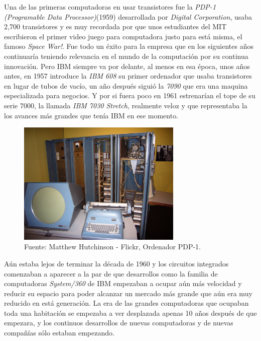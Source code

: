 \documentclass[letterpaper,12pt,oneside]{book}
\begin{document}
		Una de las primeras computadoras en usar transistores fue la \textit{PDP-1 (Programable Data Processor)}(1959) desarrollada por \textit{Digital Corporation}, usaba
		2,700 transistores y es muy recordada por que unos estudiantes del MIT escribieron el primer video juego para computadora justo para está misma, el famoso
		\textit{Space War!}. Fue todo un éxito para la empresa que en los siguientes años continuaría teniendo relevancia en el mundo de la computación
		por su continua innovación. Pero IBM siempre va por delante, al menos en esa época, unos años antes, en 1957 introduce la \textit{IBM 608} su primer ordenador
		que usaba transistores en lugar de tubos de vacío, un año después siguió la \textit{7090} que era una maquina especializada para negocios. Y por si fuera poco
		en 1961 estrenarían el tope de su serie 7000, la llamada \textit{IBM 7030 Stretch}, realmente veloz y que representaba la los avances más grandes
		que tenía IBM en ese momento\cite{oregan_brief_2012,computer_history_museum_computers_nodate}.
		
		\begin{figure}
		    \centering
		    \includegraphics[width=0.7\textwidth]{media/Historia/Wikimedia_PDP-1.jpeg}
		    \caption{Fuente: Matthew Hutchinson - Flickr, Ordenador PDP-1.} %
	    	\label{fig:pdp1}
		\end{figure}
		
		Aún estaba lejos de terminar la década de 1960 y los circuitos integrados comenzaban a aparecer a la par de que desarrollos como la familia
		de computadoras \textit{System/360} de IBM empezaban a ocupar aún más velocidad y reducir su espacio para poder alcanzar un mercado más grande que aún era
		muy reducido en está generación\cite{oregan_brief_2012}. La era de las grandes computadoras que ocupaban toda una habitación se empezaba a ver desplazada apenas 10 
		años después de que 	
		empezara, y los continuos desarrollos de nuevas computadoras y de nuevas compañías sólo estaban empezando.
				
\end{document}
